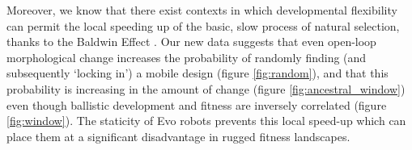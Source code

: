 Moreover, we know that there exist contexts in which developmental flexibility can permit the local speeding up of the basic, slow process of natural selection, thanks to the Baldwin Effect \cite{dennett2003baldwin}. 
Our new data suggests that even open-loop morphological change increases the probability of randomly finding (and subsequently `locking in') a mobile design (figure \ref{fig:random}), and that this probability is increasing in the amount of change (figure \ref{fig:ancestral_window}) even though ballistic development and fitness are inversely correlated (figure \ref{fig:window}). 
The staticity of Evo robots prevents this local speed-up which can place them at a significant disadvantage in rugged fitness landscapes.












